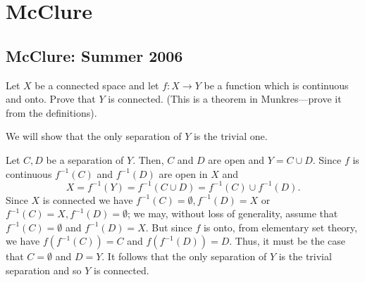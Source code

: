 \section{McClure}
\subsection{McClure: Summer 2006}
\setcounter{exercise}{0}
\setcounter{equation}{0}

\begin{problem}
  Let \(X\) be a connected space and let \(f\colon X\to Y\) be a function
  which is continuous and onto. Prove that \(Y\) is connected. (This is a
  theorem in Munkres---prove it from the definitions).
\end{problem}
\begin{solution}
  We will show that the only separation of \(Y\) is the trivial one.

  Let \(C,D\) be a separation of \(Y\). Then, \(C\) and \(D\) are open and
  \(Y=C\cup D\). Since \(f\) is continuous \(f^{-1}(C)\) and \(f^{-1}(D)\)
  are open in \(X\) and
  \[
    X=f^{-1}(Y)=f^{-1}(C\cup D)=f^{-1}(C)\cup f^{-1}(D).
  \]
  Since \(X\) is connected we have \(f^{-1}(C)=\emptyset,f^{-1}(D)=X\) or
  \(f^{-1}(C)=X,f^{-1}(D)=\emptyset\); we may, without loss of generality,
  assume that \(f^{-1}(C)=\emptyset\) and \(f^{-1}(D)=X\). But since \(f\)
  is onto, from elementary set theory, we have \(f(f^{-1}(C))=C\) and
  \(f(f^{-1}(D))=D\). Thus, it must be the case that \(C=\emptyset\) and
  \(D=Y\). It follows that the only separation of \(Y\) is the trivial
  separation and so \(Y\) is connected.
\end{solution}

